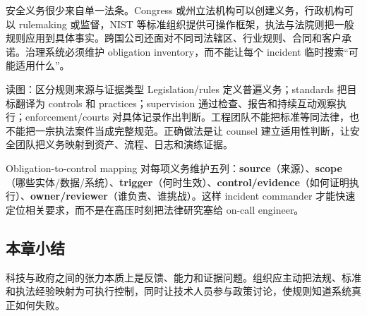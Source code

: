安全义务很少来自单一法条。Congress 或州立法机构可以创建义务，行政机构可以 rulemaking 或监督，NIST 等标准组织提供可操作框架，执法与法院则把一般规则应用到具体事实。跨国公司还面对不同司法辖区、行业规则、合同和客户承诺。治理系统必须维护 obligation inventory，而不能让每个 incident 临时搜索“可能适用什么”。


\begin{knowledgebox}{读图：区分规则来源与证据类型}
Legislation/rules 定义普遍义务；standards 把目标翻译为 controls 和 practices；supervision 通过检查、报告和持续互动观察执行；enforcement/courts 对具体记录作出判断。工程团队不能把标准等同法律，也不能把一宗执法案件当成完整规范。正确做法是让 counsel 建立适用性判断，让安全团队把义务映射到资产、流程、日志和演练证据。
\end{knowledgebox}

\begin{importantbox}{Obligation-to-control mapping}
对每项义务维护五列：\textbf{source}（来源）、\textbf{scope}（哪些实体/数据/系统）、\textbf{trigger}（何时生效）、\textbf{control/evidence}（如何证明执行）、\textbf{owner/reviewer}（谁负责、谁挑战）。这样 incident commander 才能快速定位相关要求，而不是在高压时刻把法律研究塞给 on-call engineer。
\end{importantbox}

\subsection{本章小结}

科技与政府之间的张力本质上是反馈、能力和证据问题。组织应主动把法规、标准和执法经验映射为可执行控制，同时让技术人员参与政策讨论，使规则知道系统真正如何失败。

